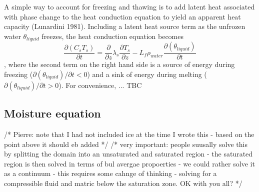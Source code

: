 A simple way to account for freezing and thawing is to add latent heat associated with phase change to the heat conduction equation to yield an apparent heat capacity (Lunardini 1981). Including a latent heat source term as the unfrozen water $\theta_{liquid}$ freezes, the heat conduction equation becomes
\begin{equation}
     \frac{\partial (C_s T_s) }{\partial t} = \frac{\partial }{\partial z}\lambda_s \frac{\partial T_s }{\partial z} - L_f \rho_{water} \frac{\partial (\theta_{liquid}) }{\partial t}
\end{equation},
where the second term on the right hand side is a source of energy during freezing ($\partial (\theta_{liquid})/{\partial t} < 0 $) and a sink of energy during melting ($\partial (\theta_{liquid})/{\partial t} > 0 $). For convenience, ... TBC

\subsection{Moisture equation}
/* Pierre: note that I had not included ice at the time I wrote this - based on the point above it should eb added */
/* very important: people suusally solve this by splitting the domain into an unsaturated and saturated region - the saturated region is then solved in terms of bul avergae propoerties - we could rather solve it as a continuum - this requires some cahnge of thinking - solving for a compressible fluid and matric below the saturation zone. OK with you all? */

